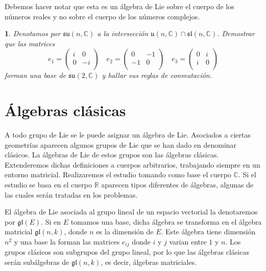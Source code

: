 \documentclass[a4paper,draft,12pt]{article}
\newtheorem{pro1}{}%
\newenvironment{pro}{\begin{pro1} \rm} {\end{pro1}}
\newcommand{\R}{\mathbb{R}}%
\newcommand{\C}{\mathbb{C}}%
\newcommand{\df}[1]{\textsf{\color{blue}#1}}
\begin{document}
Debemos hacer notar que esta es un álgebra de Lie sobre el cuerpo de los números reales y no sobre el cuerpo de los números complejos.



\begin{pro}

Denotamos por $\mathfrak{su}(n,\C)$ a la intersección  $\mathfrak{u}(n,\C) \cap \mathfrak{sl}(n,\C)$.
Demostrar que las matrices
$$
e_1= \begin{pmatrix}
i & 0\\
0 & -i \\
\end{pmatrix}
\quad
e_2= \begin{pmatrix}
0 & -1\\
-1 & 0 \\
\end{pmatrix}
\quad
e_3= \begin{pmatrix}
0 & i\\
i & 0 \\
\end{pmatrix}
$$
forman una base de $\mathfrak{su}(2,\C)$ y hallar sus reglas de conmutación.

\end{pro}

\newpage

\section{Álgebras clásicas}

A todo grupo de Lie se le puede asignar un álgebra de Lie.   Asociados a ciertas geometrías aparecen algunos grupos de Lie que se han dado en denominar clásicos.  La álgebras de Lie de estos grupos son las  \df{álgebras clásicas}. Extenderemos dichas definiciones a cuerpos arbitrarios, trabajando siempre en un entorno matricial.  Realizaremos el estudio tomando como base el cuerpo $\C$.  Si el estudio se basa en el cuerpo $\R$ aparecen tipos diferentes de álgebras, algunas de las cuales serán tratadas en los problemas.

\bigskip

El álgebra de Lie asociada al grupo lineal de un espacio vectorial la denotaremos por $\mathfrak{gl}(E)$.  Si en $E$ tomamos una base, dicha álgebra se transforma en el álgebra matricial $\mathfrak{gl}(n,k)$, donde $n$ es la dimensión de $E$.  Este álgebra tiene dimensión $n^2$ y una base la forman las matrices $e_{ij}$ donde $i$ y $j$ varian entre $1$ y $n$.  Los grupos clásicos son subgrupos del grupo lineal, por lo que las álgebras clásicas serán subálgebras de $\mathfrak{gl}(n,k)$, es decir, álgebras matriciales.
\end{document}
